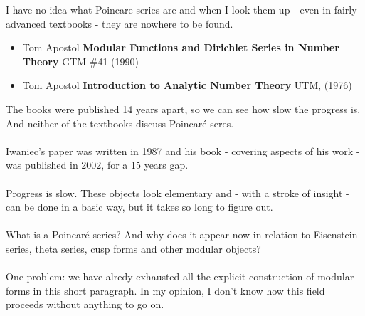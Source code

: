 \documentclass[12pt]{article}
\begin{document}
I have no idea what Poincare series are and when I look them up - even in fairly advanced textbooks - they are nowhere to be found.
\begin{itemize}
\item Tom Apostol \textbf{Modular Functions and Dirichlet Series in Number Theory} GTM \#41 (1990) 
\item Tom Apostol \textbf{Introduction to Analytic Number Theory} UTM, (1976)
\end{itemize} 
The books were published 14 years apart, so we can see how slow the progress is.  And neither of the textbooks discuss Poincar\'{e} seres.  \\\\
Iwaniec's paper was written in 1987 and his book - covering aspects of his work - was published in 2002, for a 15 years gap. \\ \\
Progress is slow.  These objects look elementary and - with a stroke of insight - can be done in a basic way, but it takes so long to figure out.  \\ \\
What is a Poincar\'{e} series?  And why does it appear now in relation to Eisenstein series, theta series, cusp forms and other modular objects? \\ \\
One problem: {\color{orange!50!black!50!green} we have alredy exhausted all the explicit construction of modular forms in this short paragraph}.  In my opinion, I don't know how this field proceeds without anything to go on.

\newpage
\end{document}
